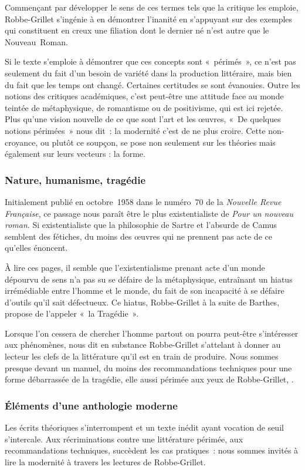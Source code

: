 Commençant par développer le sens de ces termes tels que la critique les emploie, Robbe-Grillet s'ingénie à en démontrer l'inanité en s'appuyant sur des exemples qui constituent en creux une filiation dont le dernier né n'est autre que le Nouveau~Roman.

Si le texte s'emploie à démontrer que ces concepts sont «~périmés~», ce n'est pas seulement du fait d'un besoin de variété dans la production littéraire, mais bien du fait que les temps ont changé. Certaines certitudes se sont évanouies. Outre les notions des critiques académiques, c'est peut-être une attitude face au monde teintée de métaphysique, de romantisme ou de positivisme, qui est ici rejetée. Plus qu'une vision nouvelle de ce que sont l'art et les œuvres, «~De quelques notions périmées~» nous dit~: la modernité c'est de ne plus croire. Cette non-croyance, ou plutôt ce soupçon, se pose non seulement sur les théories mais également sur leurs vecteurs : la forme.


\subsubsection{Nature, humanisme, tragédie}
Initialement publié en octobre~1958 dans le numéro~70 de la \textit{Nouvelle Revue Française}, ce passage nous paraît être le plus existentialiste de \textit{Pour un nouveau roman}. Si existentialiste que la philosophie de Sartre et l'absurde de Camus semblent des fétiches, du moins des œuvres qui ne prennent pas acte de ce qu'elles énoncent.

À lire ces pages, il semble que l'existentialisme prenant acte d'un monde dépourvu de sens n'a pas su se défaire de la métaphysique, entraînant un hiatus irrémédiable entre l'homme et le monde, du fait de son incapacité à se défaire d'outils qu'il sait défectueux. Ce hiatus, Robbe-Grillet à la suite de Barthes, propose de l'appeler «~la Tragédie~».

Lorsque l'on cessera de chercher l'homme partout on pourra peut-être s'intéresser aux phénomènes, nous dit en substance Robbe-Grillet s'attelant à donner au lecteur les clefs de la littérature qu'il est en train de produire. Nous sommes presque devant un manuel, du moins des recommandations techniques pour une forme débarrassée de la tragédie, elle aussi périmée aux yeux de Robbe-Grillet, .

\subsubsection{Éléments d'une anthologie moderne}
Les écrits théoriques s'interrompent et un texte inédit ayant vocation de seuil s'intercale. Aux récriminations contre une littérature périmée, aux recommandations techniques, succèdent les cas pratiques~: nous sommes invités à lire la modernité à travers les lectures de Robbe-Grillet.

